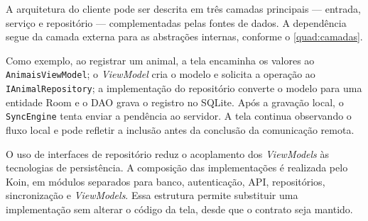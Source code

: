 A arquitetura do cliente pode ser descrita em três camadas principais --- entrada, serviço e repositório --- complementadas pelas fontes de dados. A dependência segue da camada externa para as abstrações internas, conforme o \autoref{quad:camadas}.

\begin{table}[htb]
\end{table}

Como exemplo, ao registrar um animal, a tela encaminha os valores ao \texttt{AnimaisViewModel}; o \textit{ViewModel} cria o modelo e solicita a operação ao \texttt{IAnimalRepository}; a implementação do repositório converte o modelo para uma entidade Room e o DAO grava o registro no SQLite. Após a gravação local, o \texttt{SyncEngine} tenta enviar a pendência ao servidor. A tela continua observando o fluxo local e pode refletir a inclusão antes da conclusão da comunicação remota.

O uso de interfaces de repositório reduz o acoplamento dos \textit{ViewModels} às tecnologias de persistência. A composição das implementações é realizada pelo Koin, em módulos separados para banco, autenticação, API, repositórios, sincronização e \textit{ViewModels}. Essa estrutura permite substituir uma implementação sem alterar o código da tela, desde que o contrato seja mantido.

